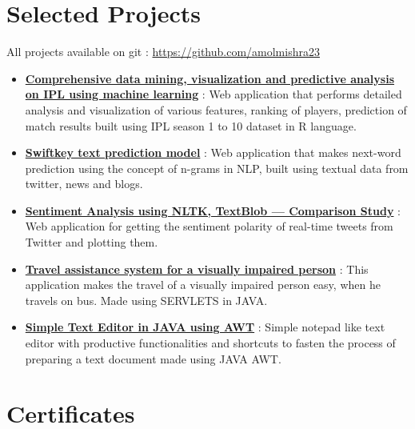 \documentclass[margin, centered]{res}
\begin{document}
\begin{resume}
\section{Selected Projects}
All projects available on git : \url{https://github.com/amolmishra23}
\begin{itemize}[leftmargin=*]
 \item \textbf{\href{https://github.com/amolmishra23/CDAI}{Comprehensive data mining, visualization and predictive analysis on IPL using machine learning}} : Web application that performs detailed analysis and visualization of various features, ranking of players, prediction of match results built using IPL season 1 to 10 dataset in R language. 
 \item \textbf{\href{https://github.com/amolmishra23/coursera-data-science-capstone}{Swiftkey text prediction model}} : Web application that makes next-word prediction using the concept of n-grams in NLP,  built using textual data from twitter, news and blogs.
 \item \textbf{\href{https://github.com/amolmishra23/twitter-sentiment-analysis}{Sentiment Analysis using NLTK, TextBlob --- Comparison Study}} : Web application for getting the sentiment polarity of real-time tweets from Twitter and plotting them.
 \item \textbf{\href{https://github.com/amolmishra23/travel_assistance_vip}{Travel assistance system for a visually impaired person}} : This application makes the travel of a visually impaired person easy, when he travels on bus. Made using SERVLETS in JAVA.
 \item \textbf{\href{https://github.com/amolmishra23/TEXT-EDITOR}{Simple Text Editor in JAVA using AWT}} : Simple notepad like text editor with productive functionalities and shortcuts to fasten the process of preparing a text document made using JAVA AWT.
\end{itemize}


\section{Certificates}


\end{resume}
\end{document}
